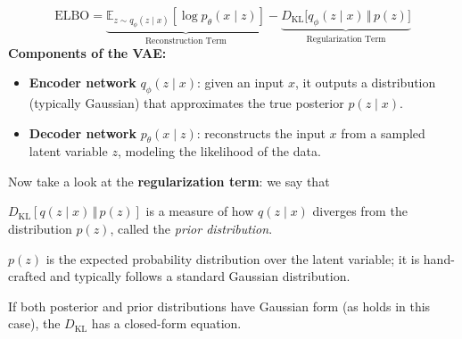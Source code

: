 \[
\mathrm{ELBO} = \underbrace{\mathbb{E}_{z \sim q_\phi(z \mid x)}[\log p_\theta(x \mid z)]}_{\text{Reconstruction Term}}
- \underbrace{D_{\mathrm{KL}}\big[q_\phi(z \mid x) \, \Vert \, p(z)\big]}_{\text{Regularization Term}}
\]
\textbf{Components of the VAE:}
\begin{itemize}
    \item \textbf{Encoder network} $q_\phi(z \mid x)$: given an input $x$, it outputs a distribution (typically Gaussian) that approximates the true posterior $p(z \mid x)$.
    \item \textbf{Decoder network} $p_\theta(x \mid z)$: reconstructs the input $x$ from a sampled latent variable $z$, modeling the likelihood of the data.
\end{itemize}

Now take a look at the \textbf{regularization term}: we say that
\begin{compactitemize}
    \item $D_{\mathrm{KL}}[q(z \mid x) \, \Vert \, p(z)]$ is a measure of how $q(z \mid x)$ diverges from the distribution $p(z)$, called the \emph{prior distribution}.  
    \item $p(z)$ is the expected probability distribution over the latent variable; it is hand-crafted and typically follows a standard Gaussian distribution.  
    \item If both posterior and prior distributions have Gaussian form (as holds in this case), the $D_{\mathrm{KL}}$ has a closed-form equation.
\end{compactitemize}


